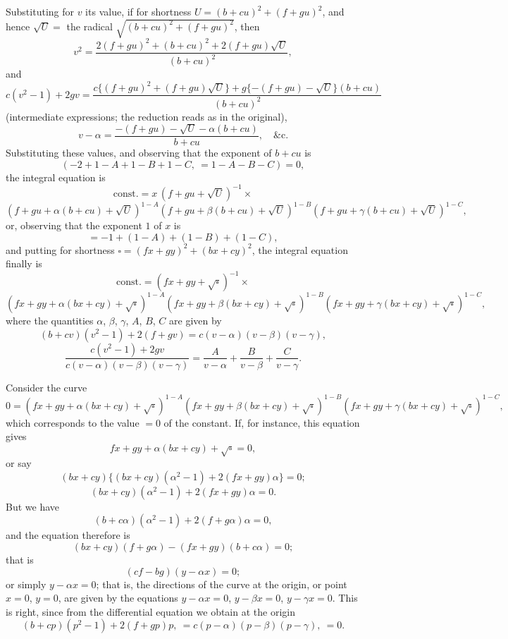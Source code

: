 \documentclass[11pt,a4paper]{article}
\theoremstyle{plain}
\begin{document}
Substituting for $v$ its value, if for shortness $U = (b + c u)^2 + (f + g u)^2$, and hence $\sqrt{U} = $ the radical $\sqrt{(b+cu)^2 + (f+gu)^2}$, then
\[
v^2 = \frac{2(f + g u)^2 + (b + c u)^2 + 2(f + g u)\sqrt{U}}{(b + c u)^2},
\]
and
\[
c(v^2 - 1) + 2 g v = \frac{c\{(f + g u)^2 + (f + g u)\sqrt{U}\} + g\{-(f + g u) - \sqrt{U}\}(b + c u)}{(b + c u)^2}
\]
(intermediate expressions; the reduction reads as in the original),
\[
v - \alpha = \frac{-(f + g u) - \sqrt{U} - \alpha(b + c u)}{b + c u},\quad \&\text{c.}
\]
\newpage
Substituting these values, and observing that the exponent of $b + c u$ is
\[
(-2 + 1 - A + 1 - B + 1 - C,\ = 1 - A - B - C) = 0,
\]
the integral equation is
\[
\text{const.} = x\,(f + g u + \sqrt{U})^{-1}\times
\]
\[
(f + g u + \alpha(b + c u) + \sqrt{U})^{1 - A}
(f + g u + \beta(b + c u) + \sqrt{U})^{1 - B}
(f + g u + \gamma(b + c u) + \sqrt{U})^{1 - C},
\]
or, observing that the exponent $1$ of $x$ is
\[
= -1 + (1 - A) + (1 - B) + (1 - C),
\]
and putting for shortness $\square = (f x + g y)^2 + (b x + c y)^2$, the integral equation finally is
\[
\text{const.} = (f x + g y + \sqrt{\square})^{-1}\times
\]
\[
(f x + g y + \alpha(b x + c y) + \sqrt{\square})^{1 - A}
(f x + g y + \beta(b x + c y) + \sqrt{\square})^{1 - B}
(f x + g y + \gamma(b x + c y) + \sqrt{\square})^{1 - C},
\]
where the quantities $\alpha$, $\beta$, $\gamma$, $A$, $B$, $C$ are given by
\[
(b + c v)(v^2 - 1) + 2(f + g v) = c(v - \alpha)(v - \beta)(v - \gamma),
\]
\[
\frac{c(v^2 - 1) + 2 g v}{c(v - \alpha)(v - \beta)(v - \gamma)} = \frac{A}{v - \alpha} + \frac{B}{v - \beta} + \frac{C}{v - \gamma}.
\]

Consider the curve
\[
0 = (f x + g y + \alpha(b x + c y) + \sqrt{\square})^{1 - A}
(f x + g y + \beta(b x + c y) + \sqrt{\square})^{1 - B}
(f x + g y + \gamma(b x + c y) + \sqrt{\square})^{1 - C},
\]
which corresponds to the value $= 0$ of the constant. If, for instance, this equation gives
\[
f x + g y + \alpha(b x + c y) + \sqrt{\square} = 0,
\]
or say
\[
(b x + c y)\{(b x + c y)(\alpha^2 - 1) + 2(f x + g y)\alpha\} = 0;
\]
\[
(b x + c y)(\alpha^2 - 1) + 2(f x + g y)\alpha = 0.
\]
But we have
\[
(b + c\alpha)(\alpha^2 - 1) + 2(f + g\alpha)\alpha = 0,
\]
and the equation therefore is
\[
(b x + c y)(f + g\alpha) - (f x + g y)(b + c\alpha) = 0;
\]
that is
\[
(c f - b g)(y - \alpha x) = 0;
\]
or simply $y - \alpha x = 0$; that is, the directions of the curve at the origin, or point $x = 0$, $y = 0$, are given by the equations $y - \alpha x = 0$, $y - \beta x = 0$, $y - \gamma x = 0$. This is right, since from the differential equation we obtain at the origin
\[
(b + c p)(p^2 - 1) + 2(f + g p)p,\ = c(p - \alpha)(p - \beta)(p - \gamma),\ = 0.
\]
\end{document}
